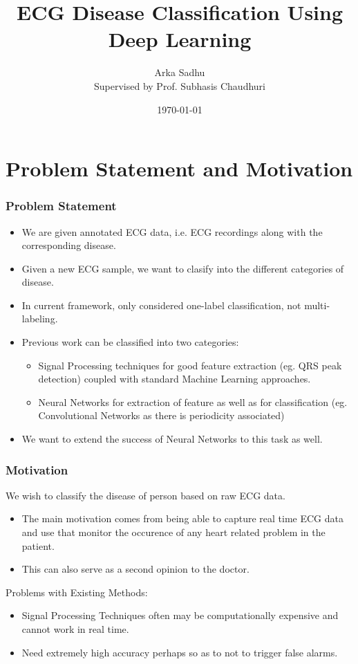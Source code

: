 \documentclass{beamer}
\title{ECG Disease Classification Using Deep Learning}
\author[Arka Sadhu]{Arka Sadhu \\ Supervised by Prof. Subhasis Chaudhuri}
\institute{IIT Bombay}
\date{\today}
\begin{document}


\begin{frame}
\titlepage
\end{frame}


\section{Problem Statement and Motivation}

\begin{frame}
  \frametitle{Problem Statement}
  \begin{itemize}
  \item We are given annotated ECG data, i.e. ECG recordings along with the corresponding disease.
  \item Given a new ECG sample, we want to clasify into the different categories of disease.
  \item In current framework, only considered one-label classification, not multi-labeling.
  \item Previous work can be classified into two categories:
    \begin{itemize}
    \item Signal Processing techniques for good feature extraction (eg. QRS peak detection) coupled with standard Machine Learning approaches.
    \item Neural Networks for extraction of feature as well as for classification (eg. Convolutional Networks as there is periodicity associated)
    \end{itemize}
  \item We want to extend the success of Neural Networks to this task as well.
  \end{itemize}
\end{frame}

\begin{frame}
  \frametitle{Motivation}
  We wish to classify the disease of person based on raw ECG data.
  \begin{itemize}
  \item The main motivation comes from being able to capture real time ECG data and use that monitor the occurence of any heart related problem in the patient.
  \item This can also serve as a second opinion to the doctor.
  \end{itemize}
  Problems with Existing Methods:
  \begin{itemize}
  \item Signal Processing Techniques often may be computationally expensive and cannot work in real time.
  \item Need extremely high accuracy perhaps so as to not to trigger false alarms.
  \end{itemize}
\end{frame}
\end{document}
